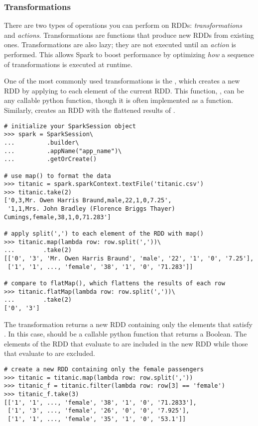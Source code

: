 \subsubsection*{Transformations}
There are two types of operations you can perform on RDDs: \textit{transformations} and \textit{actions}.
Transformations are functions that produce new RDDs from existing ones.
Transformations are also lazy; they are not executed until an \textit{action} is performed.
This allows Spark to boost performance by optimizing \textit{how} a sequence of transformations is executed at runtime.

One of the most commonly used transformations is the , which creates a new RDD by applying  to each element of the current RDD. This function, , can be any callable python function, though it is often implemented as a  function.
Similarly,  creates an RDD with the flattened results of .

\begin{lstlisting}
# initialize your SparkSession object
>>> spark = SparkSession\
...         .builder\
...         .appName("app_name")\
...         .getOrCreate()

# use map() to format the data
>>> titanic = spark.sparkContext.textFile('titanic.csv')
>>> titanic.take(2)
['0,3,Mr. Owen Harris Braund,male,22,1,0,7.25',
 '1,1,Mrs. John Bradley (Florence Briggs Thayer) Cumings,female,38,1,0,71.283']

# apply split(',') to each element of the RDD with map()
>>> titanic.map(lambda row: row.split(','))\
...		   .take(2)
[['0', '3', 'Mr. Owen Harris Braund', 'male', '22', '1', '0', '7.25'],
 ['1', '1', ..., 'female', '38', '1', '0', '71.283']]

# compare to flatMap(), which flattens the results of each row
>>> titanic.flatMap(lambda row: row.split(','))\
...		   .take(2)
['0', '3']
\end{lstlisting}

The \li{filter(func)} transformation returns a new RDD containing only the elements that satisfy . In this case,  should be a callable python function that returns a Boolean. 
The elements of the RDD that evaluate to  are included in the new RDD while those that evaluate to  are excluded.

\begin{lstlisting}
# create a new RDD containing only the female passengers
>>> titanic = titanic.map(lambda row: row.split(','))
>>> titanic_f = titanic.filter(lambda row: row[3] == 'female')
>>> titanic_f.take(3)
[['1', '1', ..., 'female', '38', '1', '0', '71.2833'],
 ['1', '3', ..., 'female', '26', '0', '0', '7.925'],
 ['1', '1', ..., 'female', '35', '1', '0', '53.1']]
\end{lstlisting}

